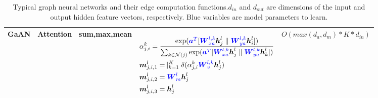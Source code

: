 \begin{table}
\begin{footnotesize}
\begin{tabular}{ccp{8em}p{22em}r}
		\textbf{GaAN} &
		Attention &
		sum,max,mean &
		\begin{scriptsize}
			$\begin{aligned}[t]
			&\alpha_{j, i}^k = \frac {\exp(\textcolor{blue}{\boldsymbol{a}^T} [ \textcolor{blue}{\boldsymbol{W}^{l, k}_{xa}} \boldsymbol{h}_j^l \parallel \textcolor{blue}{\boldsymbol{W}^{l,k}_{ya}} \boldsymbol{h}_i^l] )} {\sum_{k \in \mathcal{N}(j)}\exp(\textcolor{blue}{\boldsymbol{a}^T} [ \textcolor{blue}{\boldsymbol{W}^{l,k}_{xa}} \boldsymbol{h}_j^l \parallel \textcolor{blue}{\boldsymbol{W}^{l,k}_{ya}}  \boldsymbol{h}_k^l] )} \\
			&\boldsymbol{m}_{j, i, 1}^l = \parallel_{k=1}^K \delta(\alpha_{j, i}^k \textcolor{blue}{\boldsymbol{W}^{l,k}_v} \boldsymbol{h}_j^{l}) \\
			&\boldsymbol{m}_{j, i, 2}^l = \textcolor{blue}{\boldsymbol{W}^l_m} \boldsymbol{h}_j^{l} \\
			&\boldsymbol{m}_{j, i, 3}^l = \boldsymbol{h}_j^l
			\end{aligned}$
		\end{scriptsize} &
		$O(max(d_a, d_m) * K * d_{in})$ \\
		\bottomrule
	\end{tabular}
\end{footnotesize}
	\caption{Typical graph neural networks and their edge computation functions.$d_{in}$ and $d_{out}$ are dimensions of the input and output hidden feature vectors, respectively. Blue variables are model parameters to learn.}
	\label{tab:gnn_overview_edge}
\end{table}

